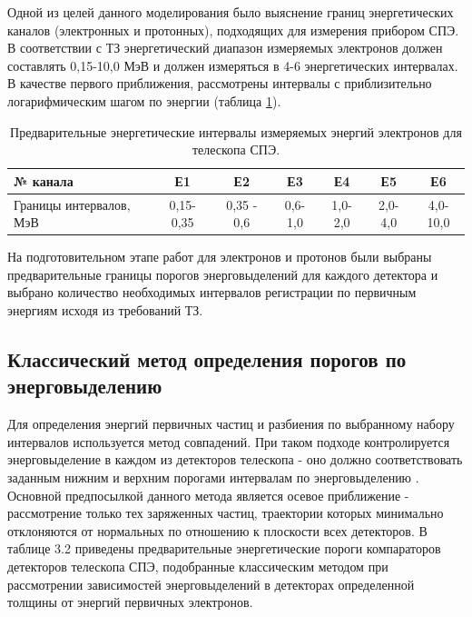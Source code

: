 Одной из целей данного моделирования было выяснение границ энергетических каналов (электронных и протонных), подходящих для измерения прибором СПЭ. В соответствии с ТЗ энергетический диапазон измеряемых электронов должен составлять 0,15-10,0 МэВ и должен измеряться в 4-6 энергетических интервалах. В качестве первого приближения, рассмотрены интервалы с приблизительно логарифмическим шагом по энергии (таблица \ref{tab:elec_channel}).

\begin{table}
	\begin{tabular}{p{4.7cm}|cccccc}
№ канала&	Е1&	Е2&	Е3&	Е4&	Е5&	Е6\\ \hline
Границы интервалов, МэВ&	0,15-0,35&	0,35 - 0,6&	0,6-1,0&	1,0-2,0&	2,0-4,0&	4,0-10,0 
\end{tabular}
	\caption{Предварительные энергетические интервалы измеряемых энергий электронов для телескопа СПЭ.}
	\label{tab:elec_channel}
\end{table} 


На подготовительном этапе работ для электронов и протонов были выбраны предварительные границы порогов энерговыделений для каждого детектора и выбрано количество необходимых интервалов регистрации по первичным энергиям исходя из требований ТЗ. 
\subsection{Классический метод определения порогов по энерговыделению}
Для определения энергий первичных частиц и разбиения по выбранному набору интервалов используется метод совпадений. При таком подходе контролируется энерговыделение в каждом из детекторов телескопа - оно должно соответствовать заданным нижним и верхним порогами интервалам по энерговыделению . Основной предпосылкой данного метода является осевое приближение - рассмотрение только тех заряженных частиц, траектории которых минимально отклоняются от нормальных по отношению к плоскости всех детекторов. В таблице 3.2 приведены предварительные энергетические пороги компараторов детекторов телескопа СПЭ, подобранные классическим методом при рассмотрении зависимостей энерговыделений в детекторах определенной толщины от энергий первичных электронов.  



